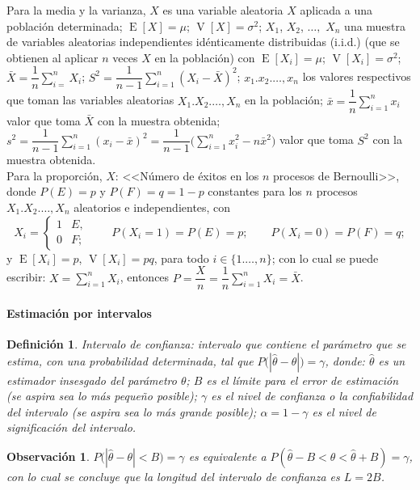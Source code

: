 \documentclass[a5paper,doc,10pt,noapacite]{apa6}
\newcommand{\dsum}{\displaystyle \sum}
\DeclareMathOperator{\Esp}{E}
\DeclareMathOperator{\Var}{V}
\newtheorem{definicion}{Definición}
\newtheorem{observ}{Observación}
\begin{document}
{{Para la media y la varianza, \(X\) es una variable aleatoria \(X\) aplicada a una población determinada; \(\Esp[X]=\mu\); \(\Var[X]=\sigma^2\); \(X_1\), \(X_2\), \(\ldots,\) \(X_n\) una muestra de variables aleatorias independientes idénticamente distribuidas (i.i.d.) (que se obtienen al aplicar \(n\) veces \(X\) en la población) con \(\Esp[X_i]=\mu\); \(\Var[X_i]=\sigma^2\); \(\bar{X}=\dfrac{1}{n}\dsum_{i=}^{n}X_i\); \(S^2=\dfrac{1}{n-1}\dsum_{i=1}^{n}(X_i-\bar{X})^2\); \(x_1.x_2.\ldots,x_n\) los valores respectivos que toman las variables aleatorias \(X_1.X_2.\ldots,X_n\) en la población; \(\bar{x}=\dfrac{1}{n}\dsum_{i=1}^{n}x_i\) valor que toma \(\bar{X}\) con la muestra obtenida; \(s^2=\dfrac{1}{n-1}\dsum_{i=1}^{n}(x_i-\bar{x})^2=\dfrac{1}{n-1} \Big(\sum_{i=1}^{n}x_i^2-n\bar{x}^2 \Big)\) valor que toma \(S^2\) con la muestra obtenida.	\\
	
Para la proporción, \(X\): <<Número de  éxitos en los \(n\) procesos de Bernoulli>>, donde \(P(E)=p\) y \(P(F)=q=1-p\) constantes para los \(n\) procesos \(X_1.X_2.\ldots,X_n\) aleatorios e independientes, con 
\[
	X_i=\begin{cases} 1 & E,\\ 0 & F;\end{cases}
	\qquad
	P(X_i=1)=P(E)=p;
	\qquad
	P(X_i=0)=P(F)=q;
\]
y \(\Esp[X_i]=p\), \(\Var[X_i]=pq\), para todo \(i \in \{1.\ldots,n\}\); con lo cual se puede escribir: \( X=\displaystyle\sum_{i=1}^{n}X_i\), entonces \(P=\dfrac{X}{n}=\dfrac{1}{n}\dsum_{i=1}^{n}X_i=\bar{X}\).

	
	

%
\paragraph{Estimación por intervalos}
	
\begin{definicion}\label{def-4.4}
	Intervalo de confianza: intervalo que contiene el parámetro que se estima, con una probabilidad determinada, tal que \(P\big( |\hat{\theta}-\theta| \big)=\gamma\), donde: \(\hat\theta\) es un estimador insesgado del parámetro \(\theta\); \(B\) es el límite para el error de estimación (se aspira sea lo más pequeño posible); \(\gamma\) es el nivel de confianza o la confiabilidad del intervalo (se aspira sea lo más grande posible); \(\alpha=1-\gamma\) es el nivel de significación del intervalo.
\end{definicion}
	
\begin{observ}
	\(P\big(\left|\hat\theta-\theta\right|<B\big)=\gamma\) es equivalente a \(P(\hat\theta-B<\theta<\hat\theta+B)=\gamma\), con lo cual se concluye que la longitud del intervalo de confianza es \(L=2B\).
\end{observ}
	
}}
\end{document}
